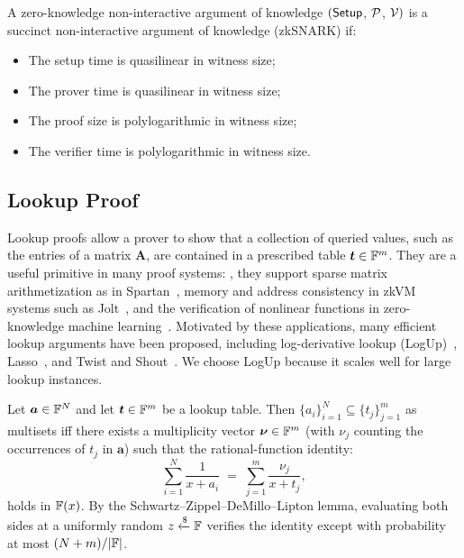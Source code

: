 \begin{definition}[zkSNARK]
	\label{def:succinctness}
	A zero-knowledge non-interactive argument of knowledge $({\sf Setup}$, $\mathcal{P}$, $\mathcal{V})$ is a succinct non-interactive argument of knowledge (zkSNARK) if:
	\begin{itemize}
	\item The setup time is quasilinear in witness size;
	\item The prover time is quasilinear in witness size;
	\item The proof size is polylogarithmic in witness size;
	\item The verifier time is polylogarithmic in witness size.
	\end{itemize}
\end{definition}



\subsection{Lookup Proof}
\label{appx:lookup}
Lookup proofs allow a prover to show that a collection of queried values,
such as the entries of a matrix $\bm{A}$, are contained in a prescribed
table $\bm{t}\in{\mathbb{F}}^m$.
They are a useful primitive in many proof systems:
\eg, they support sparse matrix arithmetization as in
Spartan~\cite{crypto/Setty20}, memory and address consistency in zkVM systems
such as Jolt~\cite{eurocrypt/ArunST24}, and the verification of nonlinear
functions in zero-knowledge machine learning~\cite{ccs/SunLZ24}. Motivated by
these applications, many efficient lookup arguments have been proposed,
including log-derivative lookup (LogUp)~\cite{iacr/Habock22a}, Lasso~\cite{eurocrypt/SettyTW24}, and
Twist and Shout~\cite{iacr/SettyT25}.
We choose LogUp because it scales well for large lookup instances.

\begin{lemma}
\label{lemma:lookup}
Let $\bm{a} \in {\mathbb{F}}^N$ and let $\bm{t} \in {\mathbb{F}}^m$ be a lookup table. Then $\{a_i\}_{i=1}^N \subseteq \{t_j\}_{j=1}^m$ as multisets iff there exists a multiplicity vector $\bm{\nu} \in {\mathbb{F}}^m$ (with $\nu_j$ counting the occurrences of $t_j$ in $\bm{a}$) such that the rational-function identity:
\[
    \sum_{i=1}^N \frac{1}{x + a_i}
    \;=\;
    \sum_{j=1}^m \frac{\nu_j}{x + t_j},
\]
holds in ${\mathbb{F}}(x)$. By the Schwartz--Zippel--DeMillo--Lipton lemma, evaluating both sides at a uniformly random $z \mathrel{\xleftarrow{\$}} {\mathbb{F}}$ verifies the identity except with probability at most $(N + m)/|{\mathbb{F}}|$.
\end{lemma}

